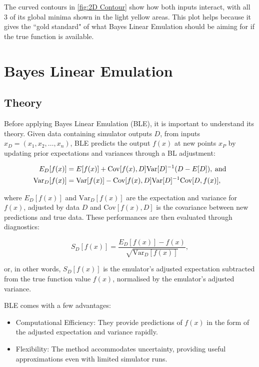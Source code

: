 \documentclass[12pt]{report} %
\begin{document}
\noindent The curved contours in \ref{fig:2D Contour} show how both inputs interact, with all 3 of its global minima shown in the light yellow areas. This plot helps because it gives the ``gold standard" of what Bayes Linear Emulation should be aiming for if the true function is available.

\section{Bayes Linear Emulation}

\subsection{Theory}
Before applying Bayes Linear Emulation (BLE), it is important to understand its theory. Given data containing simulator outputs \( D \), from inputs \( x_D = (x_1, x_2, \dots, x_n) \), BLE predicts the output \( f(x) \) at new points \( x_P \) by updating prior expectations and variances through a BL adjustment:

\begin{equation*}
\begin{aligned}
E_D[f(x)] &= E[f(x)] + \text{Cov}[f(x), D] \text{Var}[D]^{-1}(D - E[D]), \hspace{0.25em} \text{and} \\
\text{Var}_D[f(x)] &= \text{Var}[f(x)] - \text{Cov}[f(x), D] \text{Var}[D]^{-1} \text{Cov}[D, f(x)],
\end{aligned}
\end{equation*}


\noindent where $E_D[f(x)]$ and $\text{Var}_D[f(x)]$ are the expectation and variance for $f(x)$,
adjusted by data $D$ and \( \text{Cov}[f(x), D] \) is the covariance between new predictions and true data.\cite{vernon2024} These performances are then evaluated through diagnostics:

\begin{equation*}
    S_D[f(x)] = \frac{E_D[f(x)] - f(x)}{\sqrt{\text{Var}_D[f(x)]}},
\end{equation*}

\noindent or, in other words, \( S_D[f(x)] \) is the emulator's adjusted expectation subtracted from the true function value \( f(x) \), normalised by the emulator's adjusted variance. 

\noindent BLE comes with a few advantages:

\begin{itemize}
    \item Computational Efficiency: They provide predictions of $f(x)$ in the form of the adjusted expectation and variance rapidly.\cite{vernon2024} 
    \item Flexibility: The method accommodates uncertainty, providing useful approximations even with limited simulator runs.\cite{vernon2024}
\end{itemize}
\end{document}
